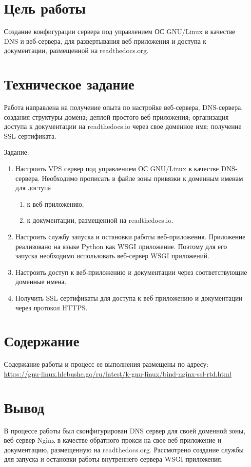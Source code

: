 \documentclass[12pt,a4paper]{article}
\begin{document}
\makeqtitle
\setcounter{page}{2}

\section{Цель работы}

Создание конфигурации сервера под управлением ОС GNU/Linux в качестве
DNS и веб-сервера, для развертывания веб-приложения и доступа к документации,
размещенной на readthedocs.org.

\section{Техническое задание}

Работа направлена на получение опыта по настройке веб-сервера, DNS-сервера, 
создания структуры домена; деплой простого веб приложения; организация доступа 
к документации на readthedocs.io через свое доменное имя; получение SSL сертификата.

Задание:

\begin{enumerate}
    \item Настроить VPS сервер под управлением ОС GNU/Linux в качестве DNS-сервера.
          Необходимо прописать в файле зоны привязки к доменным именам для доступа
        \begin{enumerate}
            \item к веб-приложению,
            \item к документации, размещенной на readthedocs.io.
        \end{enumerate}
    \item Настроить службу запуска и остановки работы веб-приложения.
          Приложение реализовано на языке Python как WSGI приложение. Поэтому для его запуска
          необходимо использовать веб-сервер WSGI приложений.
    \item Настроить доступ к веб-приложению и документации через соответствующие доменные имена.
    \item Получить SSL сертификаты для доступа к веб-приложению и документации через протокол HTTPS.
\end{enumerate}

\section{Содержание}

Содержание работы и процесс ее выполнения размещены по адресу: \\
\url{https://gnu-linux.hlebushe.gq/ru/latest/k-gnu-linux/bind-nginx-ssl-rtd.html}

\section{Вывод}

В процессе работы был сконфигурирован DNS сервер для своей доменной зоны,
веб-сервер Nginx в качестве обратного прокси на свое веб-приложение и документацию,
размещенную на readthedocs.org. Рассмотрено создание службы для запуска и остановки работы
внутреннего сервера WSGI приложения.
\end{document}
